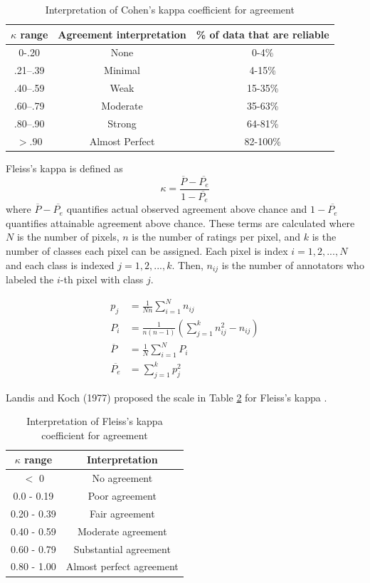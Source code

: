 \documentclass[twoside]{report}
\begin{document}
\begin{table}[ht!]
  \centering
  \begin{tabular}{|c c c|}
  \hline    
$\kappa$ range &  Agreement interpretation & \% of data that are reliable \\
\hline \hline
0-.20	& None &	0-4\% \\
.21–.39	& Minimal &	4-15\% \\
.40–.59 & Weak & 15-35\% \\
.60–.79	& Moderate & 35-63\% \\
.80–.90 & Strong &64-81\% \\
$>.90$  & Almost Perfect	& 82-100\% \\
\hline
  \end{tabular}
  \caption{Interpretation of Cohen's kappa coefficient for agreement \cite{cohens}}
  \label{tab:cohens}
\end{table}

Fleiss's kappa is defined as \[ \kappa = \frac{\overline{P} -    \overline{P_e}}{1-\overline{P_e}} \] where $\overline{P} - \overline{P_e}$ quantifies actual observed agreement above chance and $1 - \overline{P_e}$ quantifies attainable agreement above chance. These terms are calculated where $N$ is the number of pixels, $n$ is the number of ratings per pixel, and $k$ is the number of classes each pixel can be assigned. Each pixel is index $i = 1, 2, ..., N$ and each class is indexed $j = 1, 2, ..., k$. Then, $n_{ij}$ is the number of annotators who labeled the $i$-th pixel with class $j$. 

\begin{align*}
p_j &= \frac{1}{Nn} \sum_{i=1}^{N} n_{ij} \\
P_i &= \frac{1}{n(n-1)} \left(\sum_{j=1}^{k} n_{ij}^2 - n_{ij} \right) \\
\overline{P} &= \frac{1}{N} \sum_{i=1}^N P_i \\
\overline{P_e} &= \sum_{j=1}^k p_j^2
\end{align*}

Landis and Koch (1977) proposed the scale in Table \ref{tab:fleiss} for Fleiss's kappa \cite{landiskoch}. 

\begin{table}[ht!]
  \centering
  \begin{tabular}{|c c|}
  \hline    
$\kappa$ range &  Interpretation \\
\hline \hline
$<$ 0 & No agreement \\ 
0.0 - 0.19 & Poor agreement \\ 
0.20 - 0.39 & Fair agreement \\
0.40 - 0.59 & Moderate agreement \\
0.60 - 0.79 & Substantial agreement \\ 
0.80 - 1.00 & Almost perfect agreement \\
\hline
  \end{tabular}
  \caption{Interpretation of Fleiss's kappa coefficient for agreement}
  \label{tab:fleiss}
\end{table}
\end{document}
